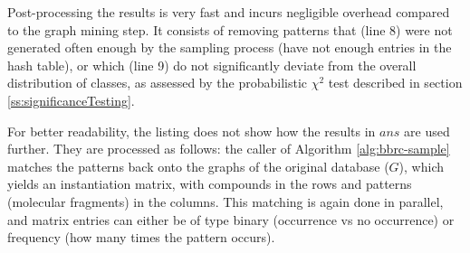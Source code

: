 \documentclass{article}
\begin{document}
Post-processing the results is very fast and incurs negligible overhead compared to the graph mining step. It consists of removing patterns that (line 8) were not generated often enough by the sampling process (have not enough entries in the hash table), or which (line 9) do not significantly deviate from the overall distribution of classes, as assessed by the probabilistic $\chi^2$ test described in section \ref{ss:significanceTesting}.

For better readability, the listing does not show how the results in $ans$ are used further. They are processed as follows: the caller of Algorithm \ref{alg:bbrc-sample} matches the patterns back onto the graphs of the original database ($G$), which yields an instantiation matrix, with compounds in the rows and patterns (molecular fragments) in the columns. This matching is again done in parallel, and matrix entries can either be of type binary (occurrence vs no occurrence) or frequency (how many times the pattern occurs).



\end{document}
